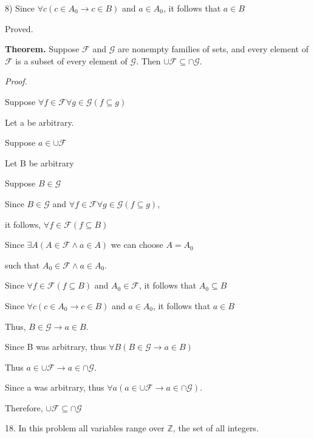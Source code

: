 \documentclass{article}
\begin{document}
8) Since $\forall c (c \in A_0 \to c \in B)$ and $a \in A_0$, it follows that $a \in B$

Proved.

\textbf{Theorem.} Suppose $\mathcal{F}$ and $\mathcal{G}$ are nonempty families of sets, and every element of
$\mathcal{F}$ is a subset of every element of $\mathcal{G}$. Then $\cup \mathcal{F} \subseteq \cap \mathcal{G}$.

\textit{Proof.}

Suppose $\forall f \in \mathcal{F} \forall g \in \mathcal{G}(f \subseteq g)$

\quad Let a be arbitrary.

\quad \quad Suppose $a \in \cup \mathcal{F}$

\quad \quad \quad Let B be arbitrary

\quad \quad \quad \quad Suppose $B \in \mathcal{G}$

\quad \quad \quad \quad \quad Since $B \in \mathcal{G}$ and $\forall f \in \mathcal{F} \forall g \in \mathcal{G}(f \subseteq g)$,

\quad \quad \quad \quad \quad it follows, $\forall f \in \mathcal{F} (f \subseteq B)$

\quad \quad \quad \quad \quad  Since $\exists A (A \in \mathcal{F} \land a \in A)$ we can choose $A = A_0$ 

\quad \quad \quad \quad \quad such that $A_0 \in \mathcal{F} \land a \in A_0$.

\quad \quad \quad \quad \quad Since $\forall f \in \mathcal{F} (f \subseteq B)$ and $A_0 \in \mathcal{F}$, it follows that $A_0 \subseteq B$

\quad \quad \quad \quad \quad Since $\forall c (c \in A_0 \to c \in B)$ and $a \in A_0$, it follows that $a \in B$

\quad \quad \quad \quad Thus, $B \in \mathcal{G} \to a \in B$.

\quad \quad \quad Since B was arbitrary, thus $\forall B (B \in \mathcal{G} \to a \in B)$

\quad \quad Thus $a \in \cup \mathcal{F} \to a \in \cap \mathcal{G}$.

\quad Since a was arbitrary, thus $\forall a (a \in \cup \mathcal{F} \to a \in \cap \mathcal{G})$.

Therefore, $\cup \mathcal{F} \subseteq \cap \mathcal{G}$

\vspace{30pt}

18. In this problem all variables range over $\mathbb{Z}$, the set of all integers.
\end{document}
